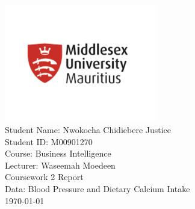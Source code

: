 \begin{titlepage}
\centering
\vspace*{1cm} %
\includegraphics[width=0.5\textwidth]{sch_banner.png}\\[2cm] %
{\large Student Name: Nwokocha Chidiebere Justice}\\[0.1cm]
{\large Student ID: M00901270}\\
{\large Course: Business Intelligence}\\
{\large Lecturer: Waseemah Moedeen}\\[0.5cm]
{\large Coursework 2 Report}\\
{\large Data: Blood Pressure and Dietary Calcium Intake}\\
{\large \today}\\
\vfill
\end{titlepage}